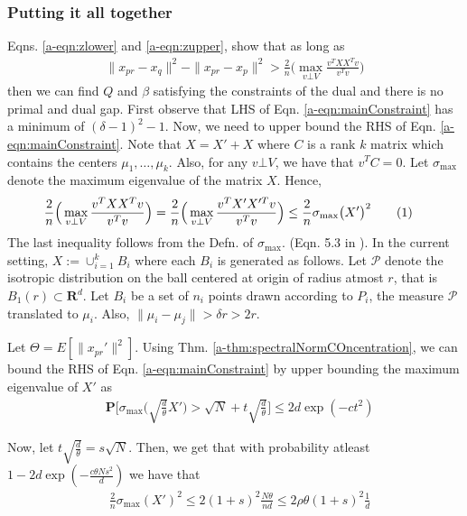 \documentclass[12pt]{article}
\newcommand{\mc}{\mathcal}
\newcommand{\mb}{\mathbf}
\newcommand\numberthis{\addtocounter{equation}{1}\tag{\theequation}}
\begin{document}
\subsubsection*{Putting it all together}
Eqns. \ref{a-eqn:zlower} and \ref{a-eqn:zupper}, show that as long as 
\begin{align}
  \|x_{pr} - x_q\|^2 - \|x_{pr}-x_p\|^2  > \frac{2}{n}\Big(\max_{v\bot V} \frac{v^T XX^Tv}{v^Tv}\Big)\label{a-eqn:mainConstraint}
\end{align}
  then we can find $Q$ and $\beta$ satisfying the constraints of the dual and there is no primal and dual gap. First observe that LHS of Eqn. \ref{a-eqn:mainConstraint} has a minimum of $(\delta - 1)^2 - 1$. Now, we need to upper bound the RHS of Eqn. \ref{a-eqn:mainConstraint}. Note that $X = X' + X$ where $C$ is a rank $k$ matrix which contains the centers $\mu_1, \ldots, \mu_k$. Also, for any $v \bot V$, we have that $v^TC = 0$. Let $\sigma_{\max}$ denote the maximum eigenvalue of the matrix $X$. Hence, 
\begin{align*}
  &\frac{2}{n}\Big(\max_{v\bot V} \frac{v^T XX^Tv}{v^Tv}\Big) = \frac{2}{n}\Big(\max_{v\bot V} \frac{v^T X'X'^Tv}{v^Tv}\Big) \le \frac{2}{n}\sigma_{\max}\big(X'\big)^2\numberthis\label{a-eqn:mainConstrintUpper}
\end{align*}
The last inequality follows from the Defn. of $\sigma_{\max}$. (Eqn. 5.3 in \cite{vershynin2010introduction}). In the current setting, $X := \cup_{i=1}^k B_i$ where each $B_i$ is generated as follows. Let $\mc P$ denote the isotropic distribution on the ball centered at origin of radius atmost $r$, that is $B_1(r)\subset \mb R^d$. Let $B_i$ be a set of $n_i$ points drawn according to $P_i$, the measure $\mc P$ translated to $\mu_i$. Also, $\|\mu_i - \mu_j\| > \delta r > 2r$. 

Let $\Theta = E[\|x_{pr}'\|^2]$. Using Thm. \ref{a-thm:spectralNormCOncentration}, we can bound the RHS of Eqn. \ref{a-eqn:mainConstraint} by upper bounding the maximum eigenvalue of $X'$ as 
\begin{align}
  &\mb P\bigg[\sigma_{\max}\bigg(\sqrt{\frac{d}{\theta}}X'\bigg) > \sqrt{N} + t\sqrt{\frac{d}{\theta}} \bigg] \le 2d\exp(-ct^2)
\end{align}

Now, let $t\sqrt{\frac{d}{\theta}} = s\sqrt{N}$. Then, we get that with probability atleast $1-2d\exp(-\frac{c\theta Ns^2}{d})$ we have that 
\begin{align*}
  &\frac{2}{n}\sigma_{\max}(X')^2 \le 2(1+s)^2\frac{N\theta}{nd} \le 2\rho\theta (1+s)^2\frac{1}{d}
\end{align*}
\end{document}
